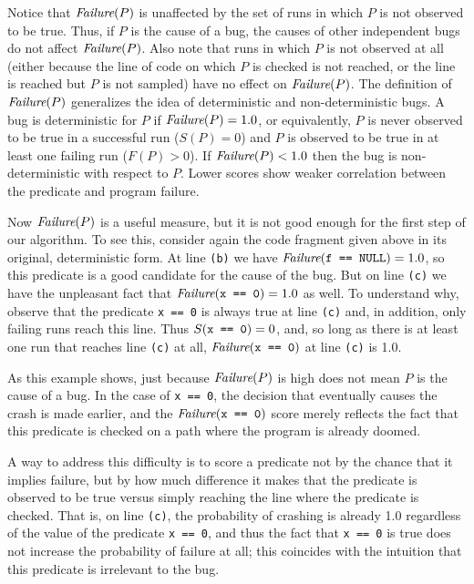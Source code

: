 Notice that $\textit{Failure}(P)$ is unaffected by the set of runs in which
$P$ is not observed to be true.  Thus, if $P$ is the cause of a bug, the
causes of other independent bugs do not affect $\textit{Failure}(P)$.
Also note that runs in which $P$ is not observed at all (either because
the line of code on which $P$ is checked is not reached, or the line is reached
but $P$ is not sampled) have no effect on $\textit{Failure}(P)$.
The definition of $\textit{Failure}(P)$
generalizes the idea of deterministic and non-deterministic bugs.  A
bug is deterministic for $P$ if $\textit{Failure}(P) = 1.0$, or equivalently,
$P$ is never observed to be true in a successful run ($S(P) =
0$) and $P$ is observed to be true in at least one failing run ($F(P) > 0$).
If $\textit{Failure}(P) < 1.0$ then the bug is non-deterministic with respect to $P$.
Lower scores show weaker correlation between the predicate and
program failure.

Now $\textit{Failure}(P)$ is a useful measure, but it is not good
enough for the first step of our algorithm. To see this, consider again the
code fragment given above in its original, deterministic form.  At line {\tt (b)} we
have $\textit{Failure}(\mbox{\tt f == NULL}) = 1.0$, so this predicate is a good
candidate for the cause of the bug.
But on line {\tt (c)} we have the unpleasant fact that $\textit{Failure}(\mbox{\tt x == 0}) = 1.0$ as well.
To understand why, observe that the 
predicate \texttt{x == 0} is always true at line {\tt (c)} and, in
addition,
only failing runs reach this line.
Thus $S(\mbox{\tt x == 0}) = 0$, and, so long as there is at least one run that
reaches line {\tt (c)} at all, $\textit{Failure}(\mbox{\tt x == 0})$ at line {\tt (c)} is 1.0.

As this example
shows, just because $\textit{Failure}(P)$ is high does not
mean $P$ is the cause of a bug.  In the case of {\tt x == 0}, the
decision that eventually causes the crash is made earlier, and the
$\textit{Failure}(\mbox{\tt x == 0})$ score merely reflects the fact that this
predicate is checked on a path where the program is already doomed.


A way to address this difficulty is to score a predicate not by the chance
that it implies failure, but by how much difference it makes that the predicate
is observed to be true versus simply reaching the line where the predicate is checked.
That is, on line {\tt (c)}, the probability of crashing is already 1.0 regardless
of the value of the predicate {\tt x == 0}, and thus the fact that {\tt x == 0} is
true does not increase the probability of failure at all; this coincides with
the intuition that this predicate is irrelevant to the bug.

